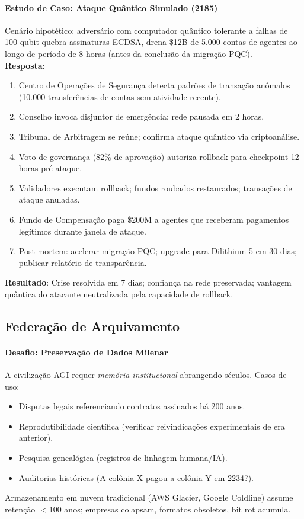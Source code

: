 \documentclass[11pt]{article}
\begin{document}
\paragraph{Estudo de Caso: Ataque Quântico Simulado (2185)}
Cenário hipotético: adversário com computador quântico tolerante a falhas de 100-qubit quebra assinaturas ECDSA, drena \$12B de 5.000 contas de agentes ao longo de período de 8 horas (antes da conclusão da migração PQC).\\
\textbf{Resposta}:
\begin{enumerate}[noitemsep]
  \item Centro de Operações de Segurança detecta padrões de transação anômalos (10.000 transferências de contas sem atividade recente).
  \item Conselho invoca disjuntor de emergência; rede pausada em 2 horas.
  \item Tribunal de Arbitragem se reúne; confirma ataque quântico via criptoanálise.
  \item Voto de governança (82\% de aprovação) autoriza rollback para checkpoint 12 horas pré-ataque.
  \item Validadores executam rollback; fundos roubados restaurados; transações de ataque anuladas.
  \item Fundo de Compensação paga \$200M a agentes que receberam pagamentos legítimos durante janela de ataque.
  \item Post-mortem: acelerar migração PQC; upgrade para Dilithium-5 em 30 dias; publicar relatório de transparência.
\end{enumerate}
\textbf{Resultado}: Crise resolvida em 7 dias; confiança na rede preservada; vantagem quântica do atacante neutralizada pela capacidade de rollback.

\subsection{Federação de Arquivamento}

\paragraph{Desafio: Preservação de Dados Milenar}
A civilização AGI requer \emph{memória institucional} abrangendo séculos. Casos de uso:
\begin{itemize}[noitemsep]
  \item Disputas legais referenciando contratos assinados há 200 anos.
  \item Reprodutibilidade científica (verificar reivindicações experimentais de era anterior).
  \item Pesquisa genealógica (registros de linhagem humana/IA).
  \item Auditorias históricas (A colônia X pagou a colônia Y em 2234?).
\end{itemize}
Armazenamento em nuvem tradicional (AWS Glacier, Google Coldline) assume retenção $<$100 anos; empresas colapsam, formatos obsoletos, bit rot acumula.
\end{document}
